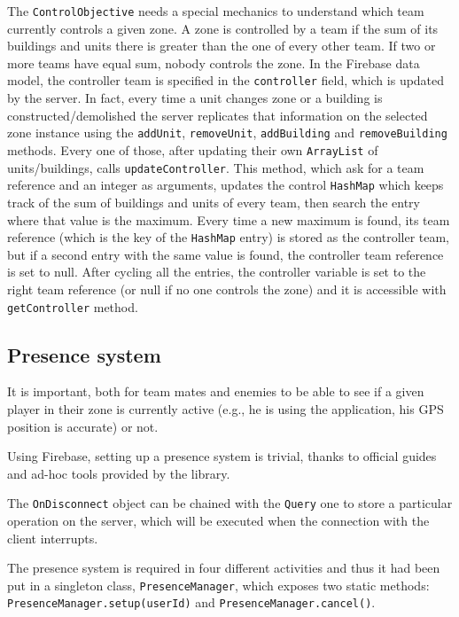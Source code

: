 			The \lstinline|ControlObjective| needs a special mechanics to understand which team currently controls a given zone.
			A zone is controlled by a team if the sum of its buildings and units there is greater than the one of every other team.
			If two or more teams have equal sum, nobody controls the zone.
			In the Firebase data model, the controller team is specified in the \lstinline|controller| field, which is updated by the server.
			In fact, every time a unit changes zone or a building is constructed/demolished the server replicates that information on the selected zone instance using the \lstinline|addUnit|, \lstinline|removeUnit|, \lstinline|addBuilding| and \lstinline|removeBuilding| methods.
			Every one of those, after updating their own \lstinline|ArrayList| of units/buildings, calls \lstinline|updateController|.
			This method, which ask for a team reference and an integer as arguments, updates the control \lstinline|HashMap| which keeps track of the sum of buildings and units of every team, then search the entry where that value is the maximum.
			Every time a new maximum is found, its team reference (which is the key of the \lstinline|HashMap| entry) is stored as the controller team, but if a second entry with the same value is found, the controller team reference is set to null.
			After cycling all the entries, the controller variable is set to the right team reference (or null if no one controls the zone) and it is accessible with \lstinline|getController| method.
		
		\subsection{Presence system}\label{focus:presence}

			It is important, both for team mates and enemies to be able to see if a given player in their zone is currently active (e.g., he is using the application, his GPS position is accurate) or not.
			
			Using Firebase, setting up a presence system is trivial, thanks to official guides\cite{firebase:presence} and ad-hoc tools provided by the library.
			
			The \lstinline|OnDisconnect| object can be chained with the \lstinline|Query| one to store a particular operation on the server, which will be executed when the connection with the client interrupts.
			
			The presence system is required in four different activities and thus it had been put in a singleton class, \lstinline|PresenceManager|, which exposes two static methods: \lstinline|PresenceManager.setup(userId)| and \lstinline|PresenceManager.cancel()|.
		 
